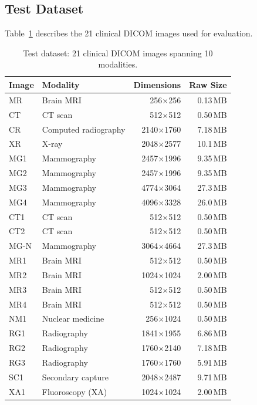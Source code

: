 \documentclass[10pt,twocolumn]{article}
\begin{document}
\subsection{Test Dataset}

Table~\ref{tab:dataset} describes the 21 clinical DICOM images used for evaluation.

\begin{table}[h]
  \centering
  \caption{Test dataset: 21 clinical DICOM images spanning 10 modalities.}
  \label{tab:dataset}
  \small
  \setlength{\tabcolsep}{3pt}
  \begin{tabular}{llrr}
    \toprule
    Image & Modality & Dimensions & Raw Size \\
    \midrule
    MR    & Brain MRI             & 256$\times$256    & 0.13\,MB \\
    CT    & CT scan               & 512$\times$512    & 0.50\,MB \\
    CR    & Computed radiography  & 2140$\times$1760  & 7.18\,MB \\
    XR    & X-ray                 & 2048$\times$2577  & 10.1\,MB \\
    MG1   & Mammography           & 2457$\times$1996  & 9.35\,MB \\
    MG2   & Mammography           & 2457$\times$1996  & 9.35\,MB \\
    MG3   & Mammography           & 4774$\times$3064  & 27.3\,MB \\
    MG4   & Mammography           & 4096$\times$3328  & 26.0\,MB \\
    CT1   & CT scan               & 512$\times$512    & 0.50\,MB \\
    CT2   & CT scan               & 512$\times$512    & 0.50\,MB \\
    MG-N  & Mammography           & 3064$\times$4664  & 27.3\,MB \\
    MR1   & Brain MRI             & 512$\times$512    & 0.50\,MB \\
    MR2   & Brain MRI             & 1024$\times$1024  & 2.00\,MB \\
    MR3   & Brain MRI             & 512$\times$512    & 0.50\,MB \\
    MR4   & Brain MRI             & 512$\times$512    & 0.50\,MB \\
    NM1   & Nuclear medicine      & 256$\times$1024   & 0.50\,MB \\
    RG1   & Radiography           & 1841$\times$1955  & 6.86\,MB \\
    RG2   & Radiography           & 1760$\times$2140  & 7.18\,MB \\
    RG3   & Radiography           & 1760$\times$1760  & 5.91\,MB \\
    SC1   & Secondary capture     & 2048$\times$2487  & 9.71\,MB \\
    XA1   & Fluoroscopy (XA)      & 1024$\times$1024  & 2.00\,MB \\
    \bottomrule
  \end{tabular}
\end{table}
\end{document}
